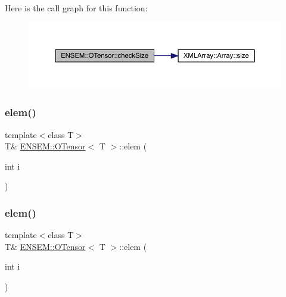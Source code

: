 Here is the call graph for this function\+:
\nopagebreak
\begin{figure}[H]
\begin{center}
\leavevmode
\includegraphics[width=350pt]{da/d8a/classENSEM_1_1OTensor_ac59e6465eb9803b05edcdec04f8d2370_cgraph}
\end{center}
\end{figure}
\mbox{\label{classENSEM_1_1OTensor_a18a4095f1e99228c27768fbea8eec05d}} 
\subsubsection{\texorpdfstring{elem()}{elem()}\hspace{0.1cm}{\footnotesize\ttfamily [1/4]}}
{\footnotesize\ttfamily template$<$class T$>$ \\
T\& \mbox{\hyperlink{classENSEM_1_1OTensor}{E\+N\+S\+E\+M\+::\+O\+Tensor}}$<$ T $>$\+::elem (\begin{DoxyParamCaption}\item[{int}]{i }\end{DoxyParamCaption})\hspace{0.3cm}{\ttfamily [inline]}}

\mbox{\label{classENSEM_1_1OTensor_a18a4095f1e99228c27768fbea8eec05d}} 
\subsubsection{\texorpdfstring{elem()}{elem()}\hspace{0.1cm}{\footnotesize\ttfamily [2/4]}}
{\footnotesize\ttfamily template$<$class T$>$ \\
T\& \mbox{\hyperlink{classENSEM_1_1OTensor}{E\+N\+S\+E\+M\+::\+O\+Tensor}}$<$ T $>$\+::elem (\begin{DoxyParamCaption}\item[{int}]{i }\end{DoxyParamCaption})\hspace{0.3cm}{\ttfamily [inline]}}

